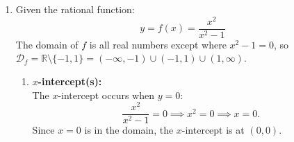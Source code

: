 \documentclass[11pt,a4paper]{article}
\begin{document}
\begin{enumerate}
\begin{enumerate}
          \item From the problem description, we are given:
                \begin{itemize}
                  \item $\dfrac{dx}{dt} = \dfrac{1}{2}\text{ cm/sec}$ ($x$ is increasing)
                  \item $\dfrac{dy}{dt} = -\dfrac{1}{4}\text{ cm/sec}$ ($y$ is decreasing)
                  \item At the given instant: $x = 3\text{ cm}$ and $y = 4\text{ cm}$
                \end{itemize}
                First, calculate the length of the diagonal $l$ at this instant:
                \[
                  l = \sqrt{x^2 + y^2} = \sqrt{3^2 + 4^2} = \sqrt{9 + 16} = \sqrt{25} = 5\text{ cm}.
                \]
                Substituting these values into the rate equation obtained in part (a):
                \begin{align*}
                  \frac{dl}{dt} & = \frac{x\dfrac{dx}{dt} + y\dfrac{dy}{dt}}{l}                                      \\
                                & = \frac{3\left(\dfrac{1}{2}\right) + 4\left(-\dfrac{1}{4}\right)}{5}               \\
                                & = \frac{\dfrac{3}{2} - 1}{5}                                                       \\
                                & = \frac{\dfrac{1}{2}}{5} = \boxed{\frac{1}{10}\text{ cm/sec} = 0.1\text{ cm/sec}}.
                \end{align*}
                Since $\dfrac{dl}{dt} = \dfrac{1}{10} > 0$, the length of the diagonal is \textbf{increasing} at a rate of $\boxed{\dfrac{1}{10}\text{ cm/sec}}$ (or $0.1\text{ cm/sec}$).
        \end{enumerate}

  \item Given the rational function:
        \[
          y = f(x) = \frac{x^2}{x^2 - 1}
        \]
        The domain of $f$ is all real numbers except where $x^2 - 1 = 0$, so $\mathcal{D}_f = \mathbb{R} \setminus \{-1, 1\} = (-\infty, -1) \cup (-1, 1) \cup (1, \infty)$.

        \begin{enumerate}
          \item \textbf{$x$-intercept(s):}\\
                The $x$-intercept occurs when $y = 0$:
                \[
                  \frac{x^2}{x^2 - 1} = 0 \implies x^2 = 0 \implies x = 0.
                \]
                Since $x = 0$ is in the domain, the $x$-intercept is at $\boxed{(0, 0)}$.


\end{enumerate}
\end{enumerate}
\end{document}
